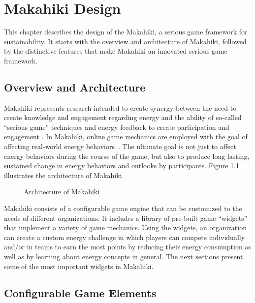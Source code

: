 \chapter{Makahiki Design}
\label{cha:makahiki-design}

This chapter describes the design of the Makahiki, a serious game framework for sustainability. It starts with the overview and architecture of Makahiki, followed by the distinctive features that make Makahiki an innovated serious game framework.

\section{Overview and Architecture}

Makahiki represents research intended to create synergy between the need to create knowledge and engagement regarding energy and the ability of so-called ``serious game'' techniques and energy feedback to create participation and engagement \cite{Deterding2011mt,darby-review-2006,Faruqui09,petersen-dorm-energy-reduction}. In Makahiki, online game mechanics are employed with the goal of affecting real-world energy behaviors~\cite{csdl2-10-07}.  The ultimate goal is not just to affect energy behaviors during the course of the game, but also to produce long lasting, sustained change in energy behaviors and outlooks by participants. Figure \ref{fig:makahiki-architecture} illustrates the architecture of Makahiki.

\begin{figure}
\begin{center}
\end{center}
\caption{Architecture of Makahiki}
\label{fig:makahiki-architecture}
\end{figure}

Makahiki consists of a configurable game engine that can be customized to the needs of different organizations.  It includes a library of pre-built game ``widgets'' that implement a variety of game mechanics.  Using the widgets, an organization can create a custom energy challenge in which players can compete individually and/or in teams to earn the most points by reducing their energy consumption as well as by learning about energy concepts in general.  The next sections present some of the most important widgets in Makahiki.

\section{Configurable Game Elements}

